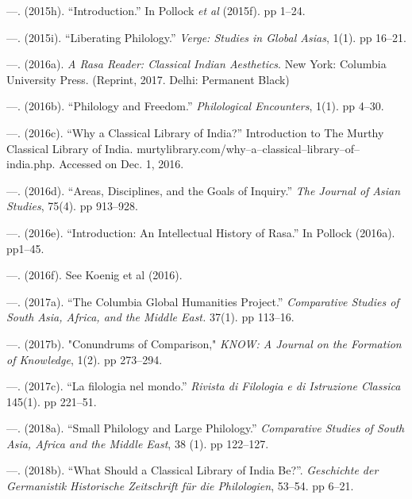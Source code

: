 \begin{thebibliography}{99}
 \item —. (2015h). “Introduction.” In Pollock \textit{et al} (2015f). pp 1–24.

 \item —. (2015i). “Liberating Philology.” \textit{Verge: Studies in Global Asias}, 1(1). pp 16–21.

 \item —. (2016a). \textit{A Rasa Reader: Classical Indian Aesthetics}. New York: Columbia University Press. (Reprint, 2017. Delhi: Permanent Black)

 \item —. (2016b). “Philology and Freedom.” \textit{Philological Encounters}, 1(1). pp 4–30.

 \item —. (2016c). “Why a Classical Library of India?” Introduction to The Murthy Classical Library of India. murtylibrary.com/why–a–classical–library–of–india.php. Accessed on Dec. 1, 2016.

 \item —. (2016d). “Areas, Disciplines, and the Goals of Inquiry.” \textit{The Journal of Asian Studies}, 75(4). pp 913–928.

 \item —. (2016e). “Introduction: An Intellectual History of Rasa.” In Pollock (2016a). pp1–45.

 \item —. (2016f). See Koenig et al (2016).

 \item —. (2017a). “The Columbia Global Humanities Project.” \textit{Comparative Studies of South Asia, Africa, and the Middle East.} 37(1). pp 113–16.

 \item —. (2017b). "Conundrums of Comparison," \textit{KNOW: A Journal on the Formation of Knowledge}, 1(2). pp 273–294.

 \item —. (2017c). “La filologia nel mondo.” \textit{Rivista di Filologia e di Istruzione Classica} 145(1). pp 221–51.

 \item —. (2018a). “Small Philology and Large Philology.” \textit{Comparative Studies of South Asia, Africa and the Middle East}, 38 (1). pp 122–127.

 \item —. (2018b). “What Should a Classical Library of India Be?”. \textit{Geschichte der Germanistik Historische Zeitschrift für die Philologien}, 53–54. pp 6–21.


\end{thebibliography}
